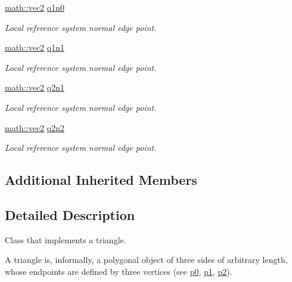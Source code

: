 \begin{DoxyCompactItemize}
\hyperlink{structphysim_1_1math_1_1vec2}{math\+::vec2} \hyperlink{classphysim_1_1geometry_1_1triangle_a9de5ea7ce4f1a2c96a76f5aec7c20fd2}{q1n0}
\begin{DoxyCompactList}\small\item\em Local reference system normal edge point. \end{DoxyCompactList}\item 
\hyperlink{structphysim_1_1math_1_1vec2}{math\+::vec2} \hyperlink{classphysim_1_1geometry_1_1triangle_a473c07e005c6f4db071924f5c9d52361}{q1n1}
\begin{DoxyCompactList}\small\item\em Local reference system normal edge point. \end{DoxyCompactList}\item 
\hyperlink{structphysim_1_1math_1_1vec2}{math\+::vec2} \hyperlink{classphysim_1_1geometry_1_1triangle_aa64e3c6fa754d12f9a94a67535e958e0}{q2n1}
\begin{DoxyCompactList}\small\item\em Local reference system normal edge point. \end{DoxyCompactList}\item 
\hyperlink{structphysim_1_1math_1_1vec2}{math\+::vec2} \hyperlink{classphysim_1_1geometry_1_1triangle_a35bbf5b5989499f0eafd6043619f3e98}{q2n2}
\begin{DoxyCompactList}\small\item\em Local reference system normal edge point. \end{DoxyCompactList}\end{DoxyCompactItemize}
\subsection*{Additional Inherited Members}


\subsection{Detailed Description}
Class that implements a triangle. 

A triangle is, informally, a polygonal object of three sides of arbitrary length, whose endpoints are defined by three vertices (see \hyperlink{classphysim_1_1geometry_1_1triangle_a0eb1d801bfd3d7c7a3fbbccfc3705f67}{p0}, \hyperlink{classphysim_1_1geometry_1_1triangle_a792e2ba27decc6582131cc6b977b8f35}{p1}, \hyperlink{classphysim_1_1geometry_1_1triangle_a5c08097d254bc239148f42951a249ce4}{p2}).

